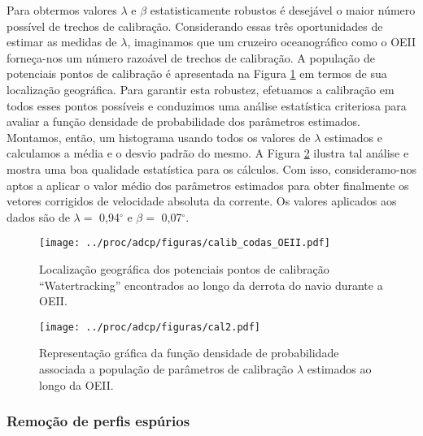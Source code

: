 Para obtermos valores  $\lambda$ e $\beta$ estatisticamente 
robustos é desejável o maior número pos\-sí\-vel de trechos de calibração.
Considerando essas três oportunidades de estimar as medidas de $\lambda$, imaginamos que um cruzeiro oceanográfico 
como o OEII forneça-nos um número razoável de trechos de calibração. A população de potenciais pontos de calibração é apresentada
na Figura \ref{fig:calib} em termos de sua localização geográfica.
 Para garantir esta robustez, efetuamos a calibração em todos
esses pontos possíveis e conduzimos uma análise estatística criteriosa para avaliar a função densidade de probabilidade dos 
parâmetros estimados. Montamos, então, um histograma usando todos os valores de $\lambda$ estimados e calculamos a média e 
o desvio padrão do mesmo. A Figura \ref{fig:hist_calib} ilustra tal análise e mostra uma boa qualidade estatística para 
os cálculos. Com isso, consideramo-nos aptos a aplicar o valor médio dos parâmetros estimados para obter finalmente os 
vetores corrigidos de velocidade absoluta da corrente. Os valores aplicados aos dados são de
$\lambda = $ 0,94$^\circ$ e $\beta = $ 0,07$^\circ$.

\begin{figure}
 \begin{center}
  \texttt{[image: ../proc/adcp/figuras/calib\_codas\_OEII.pdf]}
 \end{center}
 \vspace{-1cm}
 \renewcommand{\baselinestretch}{1}
 \caption{\label{fig:calib} \small Localização geográfica dos potenciais pontos de calibração ``Watertracking'' encontrados
ao longo da derrota do navio durante a OEII.}
\end{figure}

\begin{figure}
 \begin{center}
  \texttt{[image: ../proc/adcp/figuras/cal2.pdf]}
 \end{center}
 \vspace{-1cm}
 \renewcommand{\baselinestretch}{1}
 \caption{\label{fig:hist_calib} \small Representação gráfica da função densidade de probabilidade associada 
a po\-pu\-la\-ção de parâmetros de calibração $\lambda$ estimados ao longo da OEII.}
\end{figure}


\subsubsection{Remoção de perfis espúrios}\label{sec:edit}

